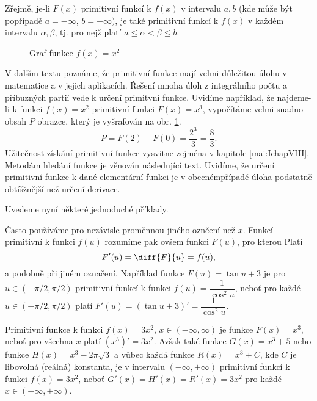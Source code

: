       Zřejmě, je-li \(F(x)\) primitivní funkcí k \(f(x)\) v intervalu \(a,b\) (kde může být
      popřípadě \(a=-\infty\), \(b=+\infty)\), je také primitivní funkcí k \(f(x)\) v každém
      intervalu \(\alpha, \beta\), tj. pro nejž platí \(a\leq\alpha<\beta\leq b\). 

      \begin{figure}[ht!]
        \centering
        \caption{Graf funkce \(f(x) = x^2\)}
        \label{mai:fig022}
      \end{figure}
      V dalším textu poznáme, že primitivní funkce mají velmi důležitou úlohu v matematice a v
      jejich aplikacích. Řešení mnoha úloh z integrálního počtu a příbuzných partií vede k určení
      primitvní funkce. Uvidíme například, že najdeme-li k funkci \(f(x)= x^2\) primitivní funkci
      \(F(x) = x^3\), vypočítáme velmi snadno obsah \(P\) obrazce, který je vyšrafován na obr.
      \ref{mai:fig022}.
      \begin{equation*}
        P = F(2) - F(0) = \frac{2^3}{3} = \frac{8}{3}.
      \end{equation*}
      Užitečnost získání primitivní funkce vysvitne zejména v kapitole \ref{mai:IchapVIII}. Metodám
      hledání funkce je věnován následující text. Uvidíme, že určení primitivní funkce k dané
      elementární funkci je v obecnémpřípadě úloha podstatně obtíšžnější než určení derivace.  
 
      Uvedeme nyní některé jednoduché příklady.
      

      Často používáme pro nezávisle proměnnou jiného oznčení než \(x\). Funkcí primitivní k funkci
      \(f(u)\) rozumíme pak ovšem funkci \(F(u)\), pro kterou Platí
      \begin{equation*}
        F'(u) = \diff{F}{u} = f(u),
      \end{equation*}
      a podobně při jiném označení. Například funkce \(F(u) = \tan u + 3\) je pro \(u\in(-\pi/2,
      \pi/2)\) primitivní funkcí k funkci \(f(u)=\dfrac{1}{\cos^2u}\), neboť pro každé \(u\in(-\pi/2,
      \pi/2)\) platí \(F'(u)=(\tan u + 3)' = \dfrac{1}{\cos^2u}\).

      Primitivní funkce k funkci \(f(x)=3x^2\), \(x\in(-\infty, \infty)\) je funkce \(F(x)=x^3\),
      neboť pro všechna \(x\) platí \((x^3)'=3x^2\). Avšak také funkce \(G(x) = x^3+5\) nebo funkce
      \(H(x)=x^3-2\pi\sqrt{3}\) a vůbec každá funkce \(R(x)=x^3+C\), kde \(C\) je libovolná (reálná)
      konstanta, je v intervalu \((-\infty, +\infty)\) primitivní funkcí k funkci \(f(x)=3x^2\),
      neboť \(G'(x)=H'(x)=R'(x)=3x^2\) pro každé \(x\in(-\infty, +\infty)\). 

